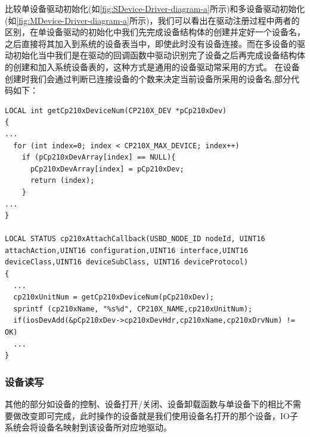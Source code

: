 	比较单设备驱动初始化(如\autoref{fig:SDevice-Driver-diagram-a}所示)和多设备驱动初始化(如\autoref{fig:MDevice-Driver-diagram-a}所示)，我们可以看出在驱动注册过程中两者的区别，在单设备驱动的初始化中我们先完成设备结构体的创建并定好一个设备名，之后直接将其加入到系统的设备表当中，即使此时没有设备连接。而在多设备的驱动初始化当中我们是在驱动的回调函数中驱动识别完了设备之后再完成设备结构体的创建和加入系统设备表的，这种方式是通用的设备驱动常采用的方式。
	在设备创建时我们会通过判断已连接设备的个数来决定当前设备所采用的设备名,部分代码如下：


\lstset{language=C}
\begin{lstlisting}
LOCAL int getCp210xDeviceNum(CP210X_DEV *pCp210xDev)
{
...
  for (int index=0; index < CP210X_MAX_DEVICE; index++)
    if (pCp210xDevArray[index] == NULL){
      pCp210xDevArray[index] = pCp210xDev;
      return (index);
    }
...
}
	
LOCAL STATUS cp210xAttachCallback(USBD_NODE_ID nodeId, UINT16 attachAction,UINT16 configuration,UINT16 interface,UINT16 deviceClass,UINT16 deviceSubClass, UINT16 deviceProtocol)
{
  ...
  cp210xUnitNum = getCp210xDeviceNum(pCp210xDev);
  sprintf (cp210xName, "%s%d", CP210X_NAME,cp210xUnitNum);
  if(iosDevAdd(&pCp210xDev->cp210xDevHdr,cp210xName,cp210xDrvNum) != OK)
  ...
}
\end{lstlisting}

\subsubsection{设备读写}





其他的部分如设备的控制、设备打开/关闭、设备卸载函数与单设备下的相比不需要做改变即可完成，此时操作的设备就是我们使用设备名打开的那个设备，IO子系统会将设备名映射到该设备所对应地驱动。



